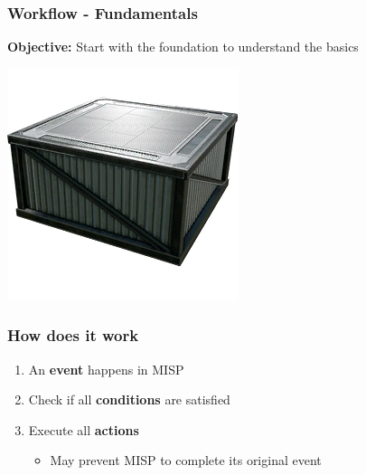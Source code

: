 \begin{frame}
    \frametitle{
        \huge
        Workflow - Fundamentals
        \vspace{1em}
    }
    \textbf{Objective:} Start with the foundation to understand the basics
    \begin{center}
        \includegraphics[width=0.07\linewidth]{pictures/fundation}
    \end{center}
\end{frame}


\begin{frame}
    \frametitle{How does it work}
    \begin{center}
    \end{center}
    \begin{enumerate}
        \item An \textbf{event} happens in MISP
        \item Check if all \textbf{conditions} are satisfied
        \item Execute all \textbf{actions}
        \begin{itemize}
            \item May prevent MISP to complete its original event
        \end{itemize}
    \end{enumerate}
\end{frame}

